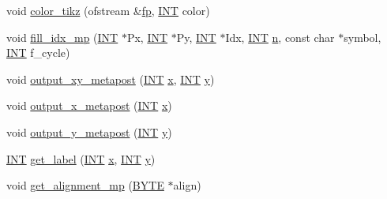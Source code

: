 \begin{DoxyCompactItemize}
\item 
void \mbox{\hyperlink{classmp__graphics_a55d0835caab08eaf3e409096bbb91d63}{color\+\_\+tikz}} (ofstream \&\mbox{\hyperlink{k__arc__lifting_8_c_a67cc9fbd0817c2d140368e5ed1f2a44d}{fp}}, \mbox{\hyperlink{galois_8h_a09fddde158a3a20bd2dcadb609de11dc}{I\+NT}} color)
\item 
void \mbox{\hyperlink{classmp__graphics_a54cc0cb42fd5e93e7519d3b71c5fe6dc}{fill\+\_\+idx\+\_\+mp}} (\mbox{\hyperlink{galois_8h_a09fddde158a3a20bd2dcadb609de11dc}{I\+NT}} $\ast$Px, \mbox{\hyperlink{galois_8h_a09fddde158a3a20bd2dcadb609de11dc}{I\+NT}} $\ast$Py, \mbox{\hyperlink{galois_8h_a09fddde158a3a20bd2dcadb609de11dc}{I\+NT}} $\ast$Idx, \mbox{\hyperlink{galois_8h_a09fddde158a3a20bd2dcadb609de11dc}{I\+NT}} \mbox{\hyperlink{simeon_8_c_a7f2cd26777ce0ff3fdaf8d02aacbddfb}{n}}, const char $\ast$symbol, \mbox{\hyperlink{galois_8h_a09fddde158a3a20bd2dcadb609de11dc}{I\+NT}} f\+\_\+cycle)
\item 
void \mbox{\hyperlink{classmp__graphics_a564e7d2700489eed72ea865b3acc14db}{output\+\_\+xy\+\_\+metapost}} (\mbox{\hyperlink{galois_8h_a09fddde158a3a20bd2dcadb609de11dc}{I\+NT}} \mbox{\hyperlink{alphabet2_8_c_a6150e0515f7202e2fb518f7206ed97dc}{x}}, \mbox{\hyperlink{galois_8h_a09fddde158a3a20bd2dcadb609de11dc}{I\+NT}} \mbox{\hyperlink{alphabet2_8_c_a0a2f84ed7838f07779ae24c5a9086d33}{y}})
\item 
void \mbox{\hyperlink{classmp__graphics_aee38beb59e940946cbb575cde90b9cfe}{output\+\_\+x\+\_\+metapost}} (\mbox{\hyperlink{galois_8h_a09fddde158a3a20bd2dcadb609de11dc}{I\+NT}} \mbox{\hyperlink{alphabet2_8_c_a6150e0515f7202e2fb518f7206ed97dc}{x}})
\item 
void \mbox{\hyperlink{classmp__graphics_a41c9d8463dc57fa97bb9a1e0577980b6}{output\+\_\+y\+\_\+metapost}} (\mbox{\hyperlink{galois_8h_a09fddde158a3a20bd2dcadb609de11dc}{I\+NT}} \mbox{\hyperlink{alphabet2_8_c_a0a2f84ed7838f07779ae24c5a9086d33}{y}})
\item 
\mbox{\hyperlink{galois_8h_a09fddde158a3a20bd2dcadb609de11dc}{I\+NT}} \mbox{\hyperlink{classmp__graphics_a09bbab6f21dcf2ab33d50c73fdeab069}{get\+\_\+label}} (\mbox{\hyperlink{galois_8h_a09fddde158a3a20bd2dcadb609de11dc}{I\+NT}} \mbox{\hyperlink{alphabet2_8_c_a6150e0515f7202e2fb518f7206ed97dc}{x}}, \mbox{\hyperlink{galois_8h_a09fddde158a3a20bd2dcadb609de11dc}{I\+NT}} \mbox{\hyperlink{alphabet2_8_c_a0a2f84ed7838f07779ae24c5a9086d33}{y}})
\item 
void \mbox{\hyperlink{classmp__graphics_afd01369d688e0d336fcae9eedae2315c}{get\+\_\+alignment\+\_\+mp}} (\mbox{\hyperlink{galois_8h_ab6cc7b4aeb6ea31aba2b3fbfc83ff5e6}{B\+Y\+TE}} $\ast$align)

\end{DoxyCompactItemize}
